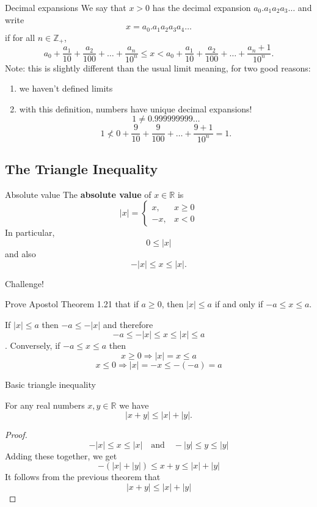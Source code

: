\documentclass{beamer}
\begin{document}
\begin{frame}{Decimal expansions}
We say that $x>0$ has the decimal expansion $a_0.a_1a_2a_3\dots$ and write
$$x = a_0.a_1a_2a_3a_4\dots$$
\pause
if for all $n\in\mathbb{Z}_+$,
$$a_0 + \frac{a_1}{10} + \frac{a_2}{100} + \dots + \frac{a_n}{10^n}
\leq x < a_0 + \frac{a_1}{10} + \frac{a_2}{100} + \dots + \frac{a_n+1}{10^n}.
$$
\pause
Note: this is slightly different than the usual limit meaning, for two good reasons:
\begin{enumerate}
\pause
\item we haven't defined limits
\pause
\item with this definition, numbers have unique decimal expansions!
\pause
$$1\neq 0.999999999\dots$$
\pause
$$1 \nless 0 + \frac{9}{10} + \frac{9}{100} + \dots + \frac{9+1}{10^n} = 1.$$
\end{enumerate}
\end{frame}

\subsection{The Triangle Inequality}

\begin{frame}{Absolute value}
The \textbf{absolute value} of $x\in \mathbb{R}$ is
$$\lvert x \rvert = \left\lbrace\begin{array}{cc}
 x,& x \geq 0\\
-x,& x < 0
\end{array}\right.$$
In particular,
$$0\leq \lvert x\rvert$$
and also
$$-\lvert x\rvert\leq x \leq \lvert x\rvert.$$
\end{frame}

\begin{frame}{Challenge!}
\begin{prob}
Prove Apostol Theorem 1.21 that if $a\geq 0$, then $\lvert x\rvert \leq a$ if and only if $-a\leq x\leq a$.
\end{prob}
\begin{soln}
If $\lvert x\rvert \leq a$ then $-a\leq -\lvert x\rvert$
\pause 
and therefore
$$-a\leq -\lvert x\rvert \leq x\leq \lvert x\rvert\leq a$$.
\pause 
Conversely, if $-a\leq x\leq a$ then
\pause 
$$x\geq 0\Rightarrow \lvert x\rvert = x\leq a$$
\pause 
$$x\leq 0\Rightarrow \lvert x\rvert = -x\leq -(-a) = a$$
\end{soln}
\end{frame}

\begin{frame}{Basic triangle inequality}
\begin{thm}
For any real numbers $x,y\in\mathbb{R}$ we have
$$\lvert x+y\rvert\leq \lvert x \rvert + \lvert y\rvert.$$
\end{thm}
\begin{proof}
$$
-\lvert x \rvert \leq x\leq \lvert x\rvert
\quad\text{and}\quad
-\lvert y \rvert \leq y\leq \lvert y\rvert
$$
\pause
Adding these together, we get
$$
-(\lvert x \rvert + \lvert y \rvert) \leq x + y\leq \lvert x\rvert + \lvert y\rvert
$$
\pause
It follows from the previous theorem that
$$\lvert x + y\rvert \leq \lvert x\rvert + \lvert y\rvert$$
\end{proof}
\end{frame}
\end{document}
